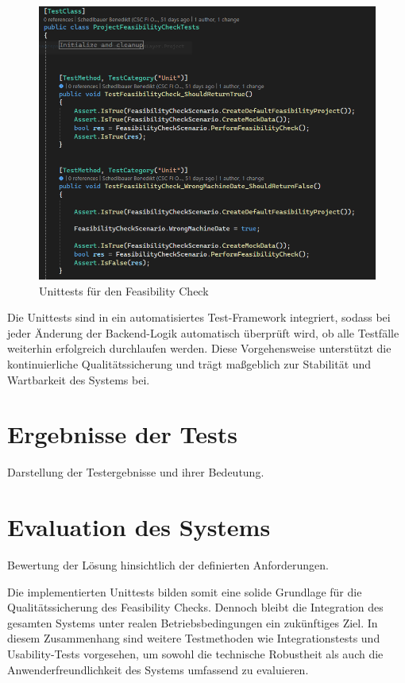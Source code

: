\begin{figure}[!htb]
    \centering
    \includegraphics[width=1\textwidth]{bilder/unittestcases.png}
    \caption{Unittests für den Feasibility Check}
    \label{fig:unittestcases}
\end{figure}

Die Unittests sind in ein automatisiertes Test-Framework integriert, sodass bei jeder Änderung der Backend-Logik automatisch überprüft wird, ob alle Testfälle weiterhin erfolgreich durchlaufen werden. Diese Vorgehensweise unterstützt die kontinuierliche Qualitätssicherung und trägt maßgeblich zur Stabilität und Wartbarkeit des Systems bei.

\section{Ergebnisse der Tests}
Darstellung der Testergebnisse und ihrer Bedeutung.

\section{Evaluation des Systems}
Bewertung der Lösung hinsichtlich der definierten Anforderungen.

Die implementierten Unittests bilden somit eine solide Grundlage für die Qualitätssicherung des Feasibility Checks. Dennoch bleibt die Integration des gesamten Systems unter realen Betriebsbedingungen ein zukünftiges Ziel. In diesem Zusammenhang sind weitere Testmethoden wie Integrationstests und Usability-Tests vorgesehen, um sowohl die technische Robustheit als auch die Anwenderfreundlichkeit des Systems umfassend zu evaluieren.